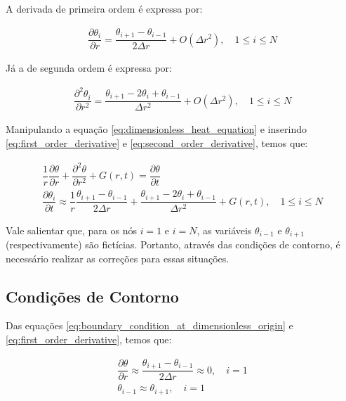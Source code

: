 A derivada de primeira ordem é expressa por:

\begin{gather}
    \dfrac{\partial \theta _i}{\partial r} = \dfrac{\theta _{i+1} - \theta _{i-1}}{2 \Delta r} + O(\Delta r^2), \quad 1 \leq i \leq N
    \label{eq:first_order_derivative}
\end{gather}

Já a de segunda ordem é expressa por:

\begin{gather}
    \dfrac{\partial ^2 \theta _i}{\partial r ^2} = \dfrac{\theta _{i+1} - 2 \theta _i + \theta _{i-1}}{\Delta r^2} + O(\Delta r^2), \quad 1 \leq i \leq N
    \label{eq:second_order_derivative}
\end{gather}

Manipulando a equação \ref{eq:dimensionless_heat_equation} e inserindo \ref{eq:first_order_derivative} e \ref{eq:second_order_derivative}, temos que:

\begin{gather}
    \dfrac{1}{r} \dfrac{\partial \theta}{\partial r} + \dfrac{\partial ^2 \theta}{\partial r ^2} + G(r, t) = \dfrac{\partial \theta}{\partial t} \\   
    \dfrac{\partial \theta _i}{\partial t} \approx \dfrac{1}{r} \dfrac{\theta _{i+1} - \theta _{i-1}}{2 \Delta r} + \dfrac{\theta _{i+1} - 2 \theta _i + \theta _{i-1}}{\Delta r^2} + G(r, t), \quad 1 \leq i \leq N
    \label{eq:discretized_heat_equation}
\end{gather}

Vale salientar que, para os nós \(i = 1\) e \(i = N\), as variáveis \(\theta _{i-1}\) e \(\theta _{i+1}\) (respectivamente) são fictícias. Portanto, através das condições de contorno, é necessário realizar as correções para essas situações.

\subsection{Condições de Contorno}

Das equações \ref{eq:boundary_condition_at_dimensionless_origin} e \ref{eq:first_order_derivative}, temos que:

\begin{gather}
    \dfrac{\partial \theta}{\partial r} \approx \dfrac{\theta _{i+1} - \theta _{i-1}}{2 \Delta r} \approx 0, \quad i = 1 \\
    \theta _{i-1} \approx \theta _{i+1}, \quad i = 1
    \label{eq:correction_at_the_origin}
\end{gather}

